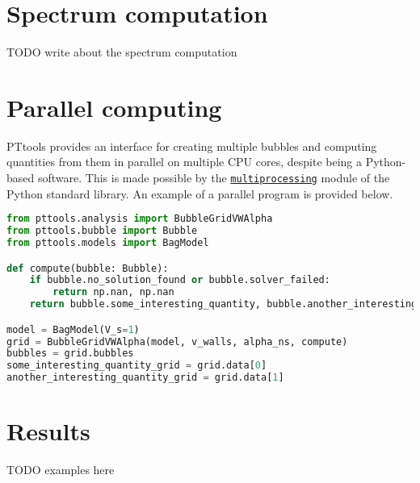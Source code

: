 

\section{Spectrum computation}
TODO write about the spectrum computation


\section{Parallel computing}
PTtools provides an interface for creating multiple bubbles and computing quantities from them in parallel on multiple CPU cores, despite being a Python-based software.
This is made possible by the
\href{https://docs.python.org/3/library/multiprocessing.html}{\texttt{multiprocessing}}
module of the Python standard library.
An example of a parallel program is provided below.

\begin{lstlisting}[language=Python]
from pttools.analysis import BubbleGridVWAlpha
from pttools.bubble import Bubble
from pttools.models import BagModel

def compute(bubble: Bubble):
	if bubble.no_solution_found or bubble.solver_failed:
		return np.nan, np.nan
	return bubble.some_interesting_quantity, bubble.another_interesting_quantity

model = BagModel(V_s=1)
grid = BubbleGridVWAlpha(model, v_walls, alpha_ns, compute)
bubbles = grid.bubbles
some_interesting_quantity_grid = grid.data[0]
another_interesting_quantity_grid = grid.data[1]
\end{lstlisting}


\section{Results}
TODO examples here

